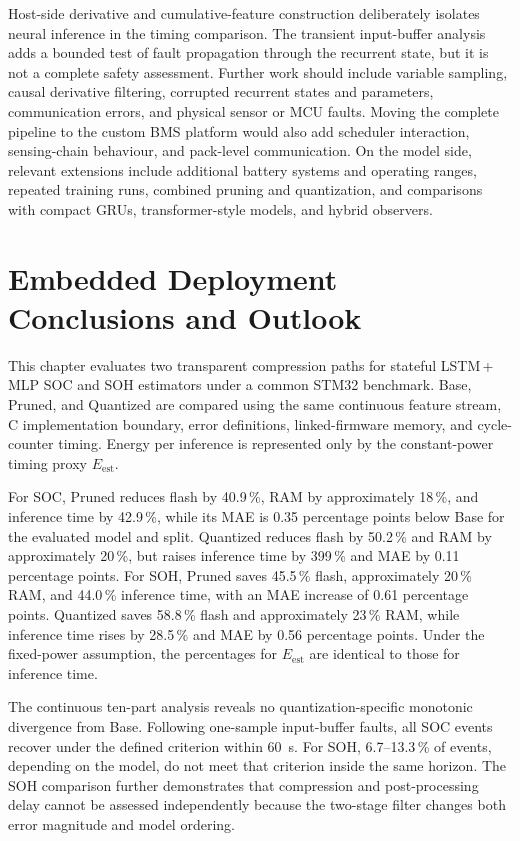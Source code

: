 \documentclass[
    a4paper,
    12pt,
    titlepage,
    bibliography=totoc,
    twoside=on,
    parskip=false,
    numbers=noenddot,
    cleardoublepage=empty,
    DIV=12,
    BCOR=12.0mm,
    headheight=36pt,
    headings=openright
]{scrreprt}
\begin{document}
Host-side derivative and cumulative-feature construction deliberately isolates neural inference in the timing comparison. The transient input-buffer analysis adds a bounded test of fault propagation through the recurrent state, but it is not a complete safety assessment. Further work should include variable sampling, causal derivative filtering, corrupted recurrent states and parameters, communication errors, and physical sensor or MCU faults. Moving the complete pipeline to the custom BMS platform would also add scheduler interaction, sensing-chain behaviour, and pack-level communication. On the model side, relevant extensions include additional battery systems and operating ranges, repeated training runs, combined pruning and quantization, and comparisons with compact GRUs, transformer-style models, and hybrid observers.\autocite{liptonCriticalReviewRecurrent2015,singhDeepMachineLearning2024,gaoEnhancedStateofchargeEstimation2022,wangFusionEstimationLithiumion2022}

\section{Embedded Deployment Conclusions and Outlook}
This chapter evaluates two transparent compression paths for stateful LSTM\,+\,MLP SOC and SOH estimators under a common STM32 benchmark. Base, Pruned, and Quantized are compared using the same continuous feature stream, C implementation boundary, error definitions, linked-firmware memory, and cycle-counter timing. Energy per inference is represented only by the constant-power timing proxy $E_{\mathrm{est}}$.

For SOC, Pruned reduces flash by 40.9\,\%, RAM by approximately 18\,\%, and inference time by 42.9\,\%, while its MAE is 0.35 percentage points below Base for the evaluated model and split. Quantized reduces flash by 50.2\,\% and RAM by approximately 20\,\%, but raises inference time by 399\,\% and MAE by 0.11 percentage points. For SOH, Pruned saves 45.5\,\% flash, approximately 20\,\% RAM, and 44.0\,\% inference time, with an MAE increase of 0.61 percentage points. Quantized saves 58.8\,\% flash and approximately 23\,\% RAM, while inference time rises by 28.5\,\% and MAE by 0.56 percentage points. Under the fixed-power assumption, the percentages for $E_{\mathrm{est}}$ are identical to those for inference time.

The continuous ten-part analysis reveals no quantization-specific monotonic divergence from Base. Following one-sample input-buffer faults, all SOC events recover under the defined criterion within 60~s. For SOH, 6.7--13.3\,\% of events, depending on the model, do not meet that criterion inside the same horizon. The SOH comparison further demonstrates that compression and post-processing delay cannot be assessed independently because the two-stage filter changes both error magnitude and model ordering.
\end{document}
